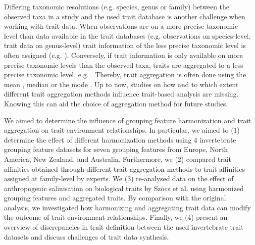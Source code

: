 \documentclass{article}
\begin{document}
Differing taxonomic resolutions (e.g. species, genus or family) between the observed taxa in a study and the used trait database is another challenge when working with trait data. When observations are on a more precise taxonomic level than data available in the trait databases (e.g. observations on species-level, trait data on genus-level) trait information of the less precise taxonomic level is often assigned (e.g. \cite{szocs_effects_2014, vos_taxonomic_2017}). Conversely, if trait information is only available on more precise taxonomic levels than the observed taxa, traits are aggregated to a less precise taxonomic level, e.g. \cite{poff_functional_2006, szocs_effects_2014, piliere_a._f._h._importance_2016, aspin_extreme_2019}. Thereby, trait aggregation is often done using the mean \cite{magliozzi_functional_2019},
median \cite{szocs_effects_2014} or the mode \cite{piliere_a._f._h._importance_2016}. Up to now, studies on how and to which extent different trait aggregation methods influence trait-based analysis are missing. Knowing this can aid the choice of aggregation method for future studies.

We aimed to determine the influence of grouping feature harmonization and trait aggregation on trait-environment relationships. In particular, we aimed to (1) determine the effect of different harmonization methods using 4 invertebrate grouping feature datasets for seven grouping features from Europe, North America, New Zealand, and Australia. Furthermore, we (2) compared trait affinities obtained through different trait aggregation methods to trait affinities assigned at family-level by experts. We (3) re-analysed data on the effect of anthropogenic salinisation on biological traits by Szöcs et al. \cite{szocs_effects_2014} using harmonized grouping features and aggregated traits. By comparison with the original analysis, we investigated how harmonizing and aggregating trait data can modify the outcome of trait-environment relationships. Finally, we (4) present an overview of discrepancies in trait definition between the used invertebrate trait datasets and discuss challenges of trait data synthesis.
\end{document}

